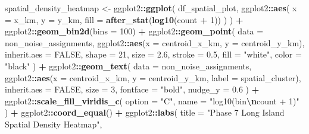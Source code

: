 \documentclass[
]{article}
\newenvironment{Shaded}{\begin{snugshade}}{\end{snugshade}}
\newcommand{\AttributeTok}[1]{\textcolor[rgb]{0.13,0.29,0.53}{#1}}
\newcommand{\ConstantTok}[1]{\textcolor[rgb]{0.56,0.35,0.01}{#1}}
\newcommand{\DecValTok}[1]{\textcolor[rgb]{0.00,0.00,0.81}{#1}}
\newcommand{\FloatTok}[1]{\textcolor[rgb]{0.00,0.00,0.81}{#1}}
\newcommand{\FunctionTok}[1]{\textcolor[rgb]{0.13,0.29,0.53}{\textbf{#1}}}
\newcommand{\NormalTok}[1]{#1}
\newcommand{\OtherTok}[1]{\textcolor[rgb]{0.56,0.35,0.01}{#1}}
\newcommand{\SpecialCharTok}[1]{\textcolor[rgb]{0.81,0.36,0.00}{\textbf{#1}}}
\newcommand{\StringTok}[1]{\textcolor[rgb]{0.31,0.60,0.02}{#1}}
\begin{document}
\begin{Shaded}
\begin{Highlighting}[]
\NormalTok{spatial\_density\_heatmap }\OtherTok{\textless{}{-}}\NormalTok{ ggplot2}\SpecialCharTok{::}\FunctionTok{ggplot}\NormalTok{(}
\NormalTok{  df\_spatial\_plot,}
\NormalTok{  ggplot2}\SpecialCharTok{::}\FunctionTok{aes}\NormalTok{(}
    \AttributeTok{x =}\NormalTok{ x\_km,}
    \AttributeTok{y =}\NormalTok{ y\_km,}
    \AttributeTok{fill =} \FunctionTok{after\_stat}\NormalTok{(}\FunctionTok{log10}\NormalTok{(count }\SpecialCharTok{+} \DecValTok{1}\NormalTok{))}
\NormalTok{  )}
\NormalTok{) }\SpecialCharTok{+}
\NormalTok{  ggplot2}\SpecialCharTok{::}\FunctionTok{geom\_bin2d}\NormalTok{(}\AttributeTok{bins =} \DecValTok{100}\NormalTok{) }\SpecialCharTok{+}
\NormalTok{  ggplot2}\SpecialCharTok{::}\FunctionTok{geom\_point}\NormalTok{(}
    \AttributeTok{data =}\NormalTok{ non\_noise\_assignments,}
\NormalTok{    ggplot2}\SpecialCharTok{::}\FunctionTok{aes}\NormalTok{(}\AttributeTok{x =}\NormalTok{ centroid\_x\_km, }\AttributeTok{y =}\NormalTok{ centroid\_y\_km),}
    \AttributeTok{inherit.aes =} \ConstantTok{FALSE}\NormalTok{,}
    \AttributeTok{shape =} \DecValTok{21}\NormalTok{,}
    \AttributeTok{size =} \FloatTok{2.6}\NormalTok{,}
    \AttributeTok{stroke =} \FloatTok{0.5}\NormalTok{,}
    \AttributeTok{fill =} \StringTok{"white"}\NormalTok{,}
    \AttributeTok{color =} \StringTok{"black"}
\NormalTok{  ) }\SpecialCharTok{+}
\NormalTok{  ggplot2}\SpecialCharTok{::}\FunctionTok{geom\_text}\NormalTok{(}
    \AttributeTok{data =}\NormalTok{ non\_noise\_assignments,}
\NormalTok{    ggplot2}\SpecialCharTok{::}\FunctionTok{aes}\NormalTok{(}\AttributeTok{x =}\NormalTok{ centroid\_x\_km, }\AttributeTok{y =}\NormalTok{ centroid\_y\_km, }\AttributeTok{label =}\NormalTok{ spatial\_cluster),}
    \AttributeTok{inherit.aes =} \ConstantTok{FALSE}\NormalTok{,}
    \AttributeTok{size =} \DecValTok{3}\NormalTok{,}
    \AttributeTok{fontface =} \StringTok{"bold"}\NormalTok{,}
    \AttributeTok{nudge\_y =} \FloatTok{0.6}
\NormalTok{  ) }\SpecialCharTok{+}
\NormalTok{  ggplot2}\SpecialCharTok{::}\FunctionTok{scale\_fill\_viridis\_c}\NormalTok{(}
    \AttributeTok{option =} \StringTok{"C"}\NormalTok{,}
    \AttributeTok{name =} \StringTok{"log10(bin}\SpecialCharTok{\textbackslash{}n}\StringTok{count + 1)"}
\NormalTok{  ) }\SpecialCharTok{+}
\NormalTok{  ggplot2}\SpecialCharTok{::}\FunctionTok{coord\_equal}\NormalTok{() }\SpecialCharTok{+}
\NormalTok{  ggplot2}\SpecialCharTok{::}\FunctionTok{labs}\NormalTok{(}
    \AttributeTok{title =} \StringTok{"Phase 7 Long Island Spatial Density Heatmap"}\NormalTok{,}

\end{Highlighting}
\end{Shaded}
\end{document}
